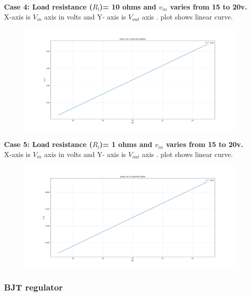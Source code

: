 \documentclass[12pt]{article}
\begin{document}
\textbf{Case 4: Load resistance (\(R_{l}\))= 10 ohms and \(v_{in}\) varies from 15 to 20v.\\}
X-axis is \(V_{in}\) axis in volts and Y- axis is \(V_{out}\) axis . plot shows linear curve.\\
\begin{figure}[h!]
\centering
\includegraphics[scale = 0.3]{zener_vin_vout_10.png}
\end{figure}
\newpage

\textbf{Case 5: Load resistance (\(R_{l}\))= 1 ohms and \(v_{in}\) varies from 15 to 20v.\\}
X-axis is \(V_{in}\) axis in volts and Y- axis is \(V_{out}\) axis . plot shows linear curve.\\
\begin{figure}[h!]
\centering
\includegraphics[scale = 0.3]{zener_vin_vout_1.png}
\end{figure}
\newpage

\subsubsection{BJT regulator}
\end{document}
